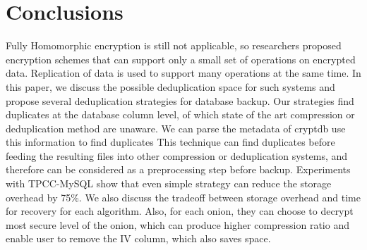 



\section{Conclusions}

Fully Homomorphic encryption is still not applicable, so researchers proposed encryption schemes that can support only a small set of operations on encrypted data. 
Replication of data is used to support many operations at the same time. 
In this paper, we discuss the possible deduplication space for such systems and propose several deduplication strategies for database backup. Our strategies find duplicates at the database column level, of which state of the art compression or deduplication method are unaware. 
We can parse the metadata of cryptdb use this information to find duplicates
This technique can find duplicates before feeding the resulting files into other compression or deduplication systems, and therefore can be considered as a preprocessing step before backup. Experiments with TPCC-MySQL show that even simple strategy can reduce the storage overhead by 75\%. We also discuss the tradeoff between storage overhead and time for recovery for each algorithm. 
Also, for each onion, they can choose to decrypt most secure level of the onion, which can produce higher compression ratio and enable user to remove the IV column, which also saves space.


